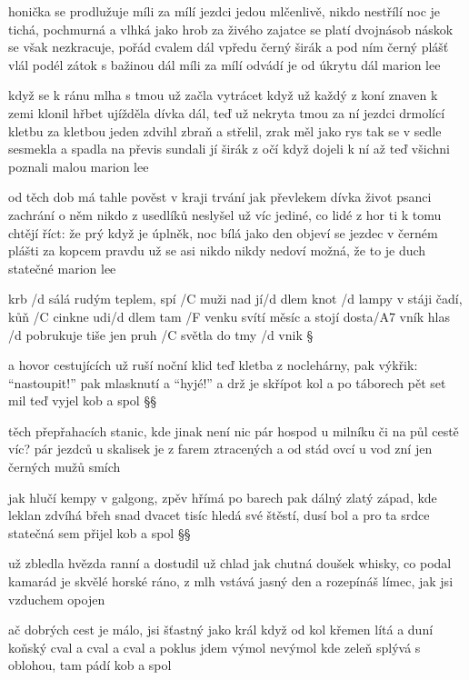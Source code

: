 honička se prodlužuje míli za mílí
jezdci jedou mlčenlivě, nikdo nestřílí
noc je tichá, pochmurná a vlhká jako hrob
za živého zajatce se platí dvojnásob
náskok se však nezkracuje, pořád cvalem dál
vpředu černý širák a pod ním černý plášť vlál
podél zátok s bažinou dál míli za mílí
odvádí je od úkrytu dál marion lee \songgg

když se k ránu mlha s tmou už začla vytrácet
když už každý z koní znaven k zemi klonil hřbet
ujížděla dívka dál, teď už nekryta tmou
za ní jezdci drmolící kletbu za kletbou
jeden zdvihl zbraň a střelil, zrak měl jako rys
tak se v sedle sesmekla a spadla na převis
sundali jí širák z očí když dojeli k ní
až teď všichni poznali malou marion lee \s

od těch dob má tahle pověst v kraji trvání
jak převlekem dívka život psanci zachrání
o něm nikdo z usedlíků neslyšel už víc
jediné, co lidé z hor ti k tomu chtějí říct:
že prý když je úplněk, noc bílá jako den
objeví se jezdec v černém plášti za kopcem
pravdu už se asi nikdo nikdy nedoví
možná, že to je duch statečné marion lee




krb /d sálá rudým teplem, spí /C muži nad jí/d dlem
knot /d lampy v stáji čadí, kůň /C cinkne udi/d dlem
tam /F venku svítí měsíc a stojí dosta/A7 vník
hlas /d pobrukuje tiše jen pruh /C světla do tmy /d vnik \S

a hovor cestujících už ruší noční klid
teď kletba z noclehárny, pak výkřik: ``nastoupit!''
pak mlasknutí a ``hyjé!'' a drž je skřípot kol
a po táborech pět set mil teď vyjel kob a spol \S\S


těch přepřahacích stanic, kde jinak není nic
pár hospod u milníku či na půl cestě víc?
pár jezdců u skalisek je z farem ztracených
a od stád ovcí u vod zní jen černých mužů smích \s

jak hlučí kempy v galgong, zpěv hřímá po barech
pak dálný zlatý západ, kde leklan zdvíhá břeh
snad dvacet tisíc hledá své štěstí, dusí bol
a pro ta srdce statečná sem přijel kob a spol \S\S


už zbledla hvězda ranní a dostudil už chlad
jak chutná doušek whisky, co podal kamarád
je skvělé horské ráno, z mlh vstává jasný den
a rozepínáš límec, jak jsi vzduchem opojen \s

ač dobrých cest je málo, jsi šťastný jako král
když od kol křemen lítá a duní koňský cval
a cval a cval a poklus jdem výmol nevýmol
kde zeleň splývá s oblohou, tam pádí kob a spol \songgg


